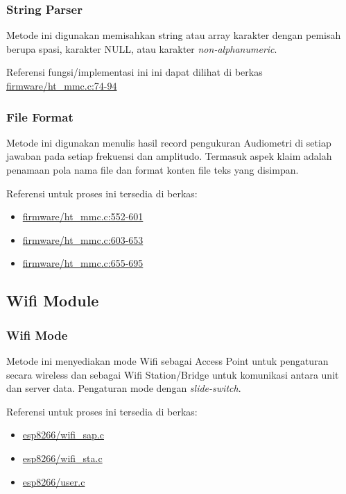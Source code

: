 \documentclass[12pt,]{article}
\begin{document}
	\subsubsection{String Parser}
	
	Metode ini digunakan memisahkan string atau array karakter dengan pemisah berupa spasi, karakter NULL, atau karakter \textit{non-alphanumeric}.
	
	Referensi fungsi/implementasi ini ini dapat dilihat di berkas
	\href{https://github.com/VibrasticLab/pikoakustik/blob/stm32f401re_3pin/firmware/ht_mmc.c#L74-L94}{firmware/ht\_mmc.c:74-94}
	
	\subsubsection{File Format}
	
	Metode ini digunakan menulis hasil record pengukuran Audiometri di setiap jawaban pada setiap frekuensi dan amplitudo.
	Termasuk aspek klaim adalah penamaan pola nama file dan format konten file teks yang disimpan.
	
	Referensi untuk proses ini tersedia di berkas:
	\begin{itemize}
		\item \href{https://github.com/VibrasticLab/pikoakustik/blob/stm32f401re_3pin/firmware/ht_mmc.c#L522-L601}{firmware/ht\_mmc.c:552-601}
		\item \href{https://github.com/VibrasticLab/pikoakustik/blob/stm32f401re_3pin/firmware/ht_mmc.c#L603-L653}{firmware/ht\_mmc.c:603-653}
		\item \href{https://github.com/VibrasticLab/pikoakustik/blob/stm32f401re_3pin/firmware/ht_mmc.c#L655-L695}{firmware/ht\_mmc.c:655-695}
	\end{itemize}

	\subsection{Wifi Module}
	
	\subsubsection{Wifi Mode}
	
	Metode ini menyediakan mode Wifi sebagai Access Point untuk pengaturan secara wireless
	dan sebagai Wifi Station/Bridge untuk komunikasi antara unit dan server data.
	Pengaturan mode dengan \textit{slide-switch}.
	
	Referensi untuk proses ini tersedia di berkas:
	\begin{itemize}
		\item \href{https://github.com/VibrasticLab/pikoakustik/blob/stm32f401re_3pin/esp8266/user/wifi_sap.c}{esp8266/wifi\_sap.c}
		\item \href{https://github.com/VibrasticLab/pikoakustik/blob/stm32f401re_3pin/esp8266/user/wifi_sta.c}{esp8266/wifi\_sta.c}
		\item \href{https://github.com/VibrasticLab/pikoakustik/blob/stm32f401re_3pin/esp8266/user/wifi_sta.c}{esp8266/user.c}
	\end{itemize}
\end{document}
